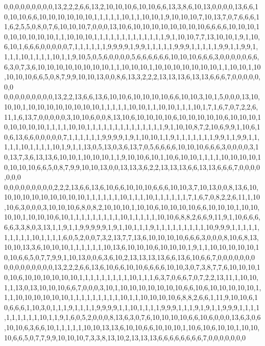 0,0,0,0,0,0,0,0,0,13,2,2,2,6,6,13,2,10,10,10,6,10,10,6,6,13,3,8,6,10,13,0,0,0,0,13,6,6,10,10,10,6,6,10,10,10,10,10,10,1,1,1,1,1,10,1,1,10,10,1,9,10,10,10,7,10,13,7,0,7,6,6,6,11,6,2,5,5,0,8,0,7,6,10,10,10,7,0,0,0,13,10,6,10,10,10,10,10,10,10,10,6,6,6,6,10,10,10,10,10,10,10,10,10,1,1,10,10,10,1,1,1,1,1,1,1,1,1,1,1,1,1,9,1,10,10,7,7,13,10,10,1,9,1,10,6,10,1,6,6,6,0,0,0,0,0,7,1,1,1,1,1,1,9,9,9,9,1,9,9,1,1,1,1,1,9,9,9,1,1,1,1,1,9,9,1,1,9,9,1,1,1,1,10,1,1,1,1,10,1,1,9,10,5,0,5,6,0,0,0,0,5,6,6,6,6,6,6,10,10,10,6,6,6,3,0,0,0,0,0,6,6,6,3,0,7,3,6,10,10,10,10,10,10,10,10,1,1,10,10,10,1,10,10,10,10,10,10,10,1,1,10,10,1,10,10,10,10,6,6,5,0,8,7,9,9,10,10,13,0,0,8,6,13,3,2,2,2,13,13,13,6,13,13,6,6,6,7,0,0,0,0,0,0,0
0,0,0,0,0,0,0,0,0,13,2,2,13,6,6,13,6,10,10,6,10,10,10,10,6,6,10,10,3,10,1,5,0,0,0,13,10,10,10,1,10,10,10,10,10,10,10,10,1,1,1,1,1,10,10,1,1,10,10,1,1,1,10,1,7,1,6,7,0,7,2,2,6,11,1,6,13,7,0,0,0,0,0,3,10,10,6,0,0,8,13,10,6,10,10,10,10,6,10,10,10,10,10,6,10,10,10,10,10,10,10,10,1,1,1,1,10,10,1,1,1,1,1,1,1,1,1,1,1,1,1,1,9,1,10,10,8,7,2,10,6,9,9,1,10,6,10,6,13,6,6,0,0,0,0,0,7,1,1,1,1,1,1,9,9,9,9,1,9,1,10,10,1,1,9,1,1,1,1,1,1,1,9,9,1,1,9,9,1,1,1,1,1,10,1,1,1,1,10,1,9,1,1,13,0,5,13,0,3,6,13,7,0,5,6,6,6,6,10,10,10,6,6,6,3,0,0,0,0,3,10,13,7,3,6,13,13,6,10,10,1,10,10,10,1,1,9,10,10,6,10,1,10,6,10,10,1,1,1,1,10,10,10,10,10,10,10,10,6,6,5,0,8,7,9,9,10,10,13,0,0,13,13,3,6,2,2,13,13,13,6,6,13,13,6,6,6,7,0,0,0,0,0,0,0
0,0,0,0,0,0,0,0,0,2,2,2,13,6,6,13,6,10,6,6,10,10,10,6,6,6,10,10,3,7,10,13,0,0,8,13,6,10,10,10,10,10,10,10,10,10,10,1,1,1,1,1,1,10,1,1,1,10,1,1,1,1,1,1,7,1,6,7,0,8,2,2,6,11,1,10,10,6,3,0,0,0,3,10,10,10,6,8,0,8,2,10,10,10,1,10,10,6,10,10,10,10,6,6,10,10,10,1,10,10,10,10,1,10,10,10,6,10,1,1,1,1,1,1,1,1,1,10,1,1,1,1,1,10,10,6,8,8,2,6,6,9,11,9,1,10,6,6,6,6,6,3,3,8,0,3,13,1,1,9,1,1,9,9,9,9,9,1,9,1,10,1,1,1,9,1,1,1,1,1,1,1,1,1,10,9,9,9,1,1,1,1,1,1,1,1,1,1,10,1,1,1,1,6,0,5,2,0,0,7,3,2,13,7,7,13,6,10,10,10,10,6,6,6,3,0,0,0,8,10,6,8,13,10,10,13,3,6,10,10,10,1,1,1,1,1,1,10,13,6,10,10,10,6,10,10,10,1,9,1,1,10,10,10,10,10,10,10,6,6,5,0,7,7,9,9,1,10,13,0,0,6,3,6,10,2,13,13,13,13,6,6,13,6,10,6,6,7,0,0,0,0,0,0,0
0,0,0,0,0,0,0,0,0,13,2,2,2,6,6,13,6,10,6,6,10,10,6,6,6,6,10,10,3,0,7,3,8,7,7,6,10,10,10,10,10,6,10,10,10,10,10,10,1,1,1,1,1,1,1,1,1,10,1,1,1,6,3,7,0,6,6,7,0,7,2,2,13,11,1,10,10,1,1,13,0,13,10,10,10,6,6,7,0,0,0,3,10,1,10,10,10,10,10,10,10,6,6,10,6,10,10,10,10,10,1,1,1,10,10,10,10,10,10,1,1,1,1,1,1,1,1,1,10,1,1,10,10,10,10,6,8,8,2,6,6,1,11,9,10,10,6,10,6,6,6,1,10,3,0,1,1,1,9,1,1,1,1,9,9,9,9,1,1,10,1,1,1,1,9,9,9,1,1,1,9,1,9,1,1,9,9,9,1,1,1,1,1,1,1,1,1,1,10,1,1,9,1,6,0,5,2,0,0,0,8,13,6,3,0,7,6,10,10,10,10,6,6,10,6,0,0,0,13,6,3,0,6,10,10,6,3,6,6,10,1,1,1,1,1,10,10,13,13,6,10,10,6,6,10,10,10,1,10,6,10,6,10,10,1,10,10,10,6,6,5,0,7,7,9,9,10,10,10,7,3,3,8,13,10,2,13,13,13,6,6,6,6,6,6,6,6,7,0,0,0,0,0,0,0
